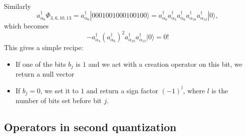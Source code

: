 \documentclass[%
twoside,                 %
final,                   %
10pt]{article}
\begin{document}
\paragraph{}
Similarly
\[
a^{\dagger}_{\alpha_6}\Phi_{3,6,10,13} = a^{\dagger}_{\alpha_6}|0001001000100100\rangle=a^{\dagger}_{\alpha_6}a_{\alpha_3}^{\dagger} a_{\alpha_6}^{\dagger} a_{\alpha_{10}}^{\dagger} a_{\alpha_{13}}^{\dagger} |0\rangle,
\]
which becomes
\[
-a^{\dagger}_{\alpha_4} (a_{\alpha_6}^{\dagger})^ 2 a_{\alpha_{10}}^{\dagger} a_{\alpha_{13}}^{\dagger} |0\rangle=0!
\]
This gives a simple recipe:  
\begin{itemize}
\item If one of the bits $b_j$ is $1$ and we act with a creation operator on this bit, we return a null vector

\item If $b_j=0$, we set it to $1$ and return a sign factor $(-1)^l$, where $l$ is the number of bits set before bit $j$.
\end{itemize}

\noindent




\subsection*{Operators in second quantization}

\end{document}

